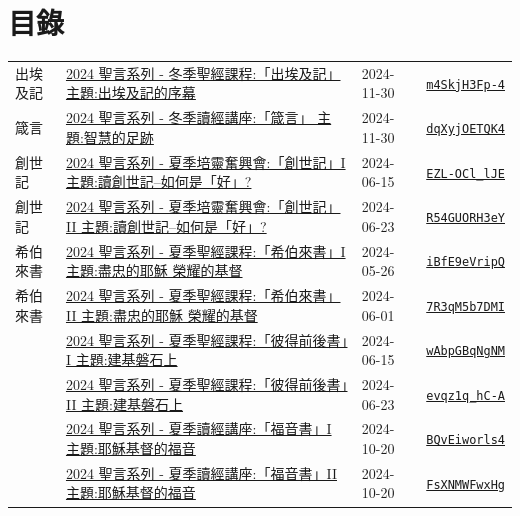 \documentclass{book}
\begin{document}
\section{目錄}
\label{sec:index}
{ \scriptsize


\begin{xltabular}{\textwidth}{|p{0.15\textwidth} p{0.6\textwidth}|p{0.07\textwidth} p{0.1\textwidth}|}
\hline
出埃及記   & \hyperref[sec:m4SkjH3Fp_4]{2024 聖言系列 - 冬季聖經課程:「出埃及記」 主題:出埃及記的序幕} & 2024-11-30 & \href{https://youtube.com/watch?v=m4SkjH3Fp-4}{\texttt{m4SkjH3Fp-4}} \\
箴言   & \hyperref[sec:dqXyjOETQK4]{2024 聖言系列 - 冬季讀經講座:「箴言」 主題:智慧的足跡} & 2024-11-30 & \href{https://youtube.com/watch?v=dqXyjOETQK4}{\texttt{dqXyjOETQK4}} \\
創世記   & \hyperref[sec:EZL_OCl_lJE]{2024 聖言系列 - 夏季培靈奮興會:「創世記」I 主題:讀創世記–如何是「好」?} & 2024-06-15 & \href{https://youtube.com/watch?v=EZL-OCl_lJE}{\texttt{EZL-OCl\_lJE}} \\
創世記   & \hyperref[sec:R54GUORH3eY]{2024 聖言系列 - 夏季培靈奮興會:「創世記」II 主題:讀創世記–如何是「好」?} & 2024-06-23 & \href{https://youtube.com/watch?v=R54GUORH3eY}{\texttt{R54GUORH3eY}} \\
希伯來書   & \hyperref[sec:iBfE9eVripQ]{2024 聖言系列 - 夏季聖經課程:「希伯來書」I 主題:盡忠的耶穌 榮耀的基督} & 2024-05-26 & \href{https://youtube.com/watch?v=iBfE9eVripQ}{\texttt{iBfE9eVripQ}} \\
希伯來書   & \hyperref[sec:7R3qM5b7DMI]{2024 聖言系列 - 夏季聖經課程:「希伯來書」II 主題:盡忠的耶穌 榮耀的基督} & 2024-06-01 & \href{https://youtube.com/watch?v=7R3qM5b7DMI}{\texttt{7R3qM5b7DMI}} \\
    & \hyperref[sec:wAbpGBqNgNM]{2024 聖言系列 - 夏季聖經課程:「彼得前後書」I 主題:建基磐石上} & 2024-06-15 & \href{https://youtube.com/watch?v=wAbpGBqNgNM}{\texttt{wAbpGBqNgNM}} \\
    & \hyperref[sec:evqz1q_hC_A]{2024 聖言系列 - 夏季聖經課程:「彼得前後書」II 主題:建基磐石上} & 2024-06-23 & \href{https://youtube.com/watch?v=evqz1q_hC-A}{\texttt{evqz1q\_hC-A}} \\
    & \hyperref[sec:BQvEiworls4]{2024 聖言系列 - 夏季讀經講座:「福音書」I 主題:耶穌基督的福音} & 2024-10-20 & \href{https://youtube.com/watch?v=BQvEiworls4}{\texttt{BQvEiworls4}} \\
    & \hyperref[sec:FsXNMWFwxHg]{2024 聖言系列 - 夏季讀經講座:「福音書」II 主題:耶穌基督的福音} & 2024-10-20 & \href{https://youtube.com/watch?v=FsXNMWFwxHg}{\texttt{FsXNMWFwxHg}} \\

\end{xltabular}}
\end{document}
